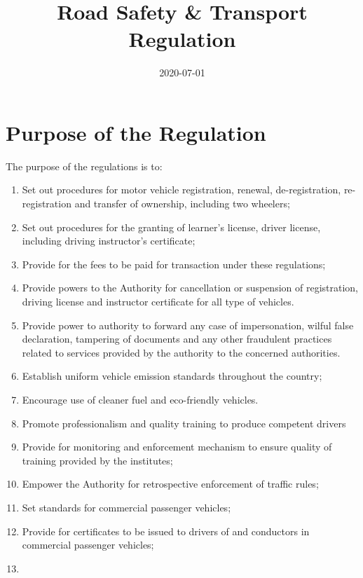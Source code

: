 \documentclass[
]{book}
\title{Road Safety \& Transport Regulation}
\author{}
\date{\vspace{-2.5em}2020-07-01}
\providecommand{\tightlist}{%
  \setlength{\itemsep}{0pt}\setlength{\parskip}{0pt}}
\begin{document}
\maketitle

{
\setcounter{tocdepth}{1}
\tableofcontents
}
\hypertarget{purpose-of-the-regulation}{%
\chapter{Purpose of the Regulation}\label{purpose-of-the-regulation}}

The purpose of the regulations is to:

\begin{enumerate}
\def\labelenumi{\arabic{enumi}.}
\tightlist
\item
  Set out procedures for motor vehicle registration, renewal, de-registration, re-registration and transfer of ownership, including two wheelers;
\item
  Set out procedures for the granting of learner's license, driver license, including driving instructor's certificate;
\item
  Provide for the fees to be paid for transaction under these regulations;
\item
  Provide powers to the Authority for cancellation or suspension of registration, driving license and instructor certificate for all type of vehicles.
\item
  Provide power to authority to forward any case of impersonation, wilful false declaration, tampering of documents and any other fraudulent practices related to services provided by the authority to the concerned authorities.
\item
  Establish uniform vehicle emission standards throughout the country;
\item
  Encourage use of cleaner fuel and eco-friendly vehicles.
\item
  Promote professionalism and quality training to produce competent drivers
\item
  Provide for monitoring and enforcement mechanism to ensure quality of training provided by the institutes;
\item
  Empower the Authority for retrospective enforcement of traffic rules;
\item
  Set standards for commercial passenger vehicles;
\item
  Provide for certificates to be issued to drivers of and conductors in commercial passenger vehicles;
\item

\end{enumerate}
\end{document}
